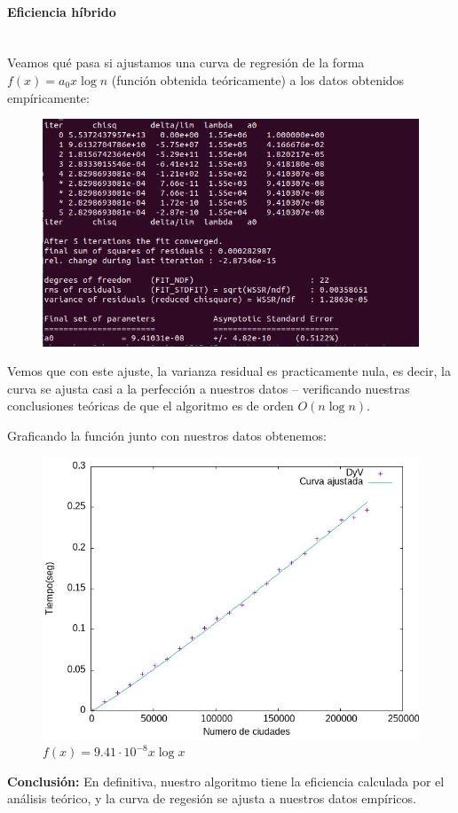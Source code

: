 \documentclass{article}
\newcommand{\myparagraph}[1]{\paragraph{#1}\mbox{}\\}
\begin{document}
\myparagraph{Eficiencia híbrido}

    Veamos qué pasa si ajustamos una curva de regresión de la 
    forma $ f(x) = a_0 x \log{n} $ (función obtenida teóricamente) a los datos obtenidos 
    empíricamente:
    
    \begin{figure}[H]
        \centering
        \includegraphics[width=0.5\linewidth]{P3/P3_regresionDyV.png}
    \end{figure}
    
   Vemos que con este ajuste, la varianza residual es practicamente nula, es decir, la curva se ajusta casi a la perfección a nuestros datos -- verificando nuestras conclusiones teóricas de que el algoritmo es de orden $O(n \log{n})$. 

   Graficando la función junto con nuestros datos obtenemos:

   \begin{figure}[H]
       \centering
       \includegraphics[scale=0.5]{P3/Curva_regresionDyV.jpeg}
       \caption{\centering $f(x) = 9.41\cdot10^{-8} x \log{x}$}
   \end{figure}

    \textbf{Conclusión:} En definitiva, nuestro algoritmo tiene la eficiencia calculada por el análisis teórico, y la curva de regesión se ajusta 
    a nuestros datos empíricos.
   
\end{document}
